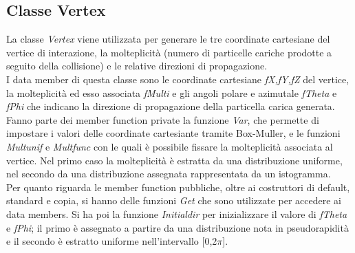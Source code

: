 \documentclass{article}
\begin{document}
\subsection{Classe Vertex}
La classe \textit{Vertex} viene utilizzata per generare le tre coordinate cartesiane del vertice di interazione, la molteplicità (numero di particelle cariche prodotte a seguito della collisione) e le relative direzioni di propagazione.
\\
I data member di questa classe sono le coordinate cartesiane \textit{fX,fY,fZ} del vertice, la molteplicità ed esso associata \textit{fMulti} e gli angoli polare e azimutale \textit{fTheta} e \textit{fPhi} che indicano la direzione di propagazione della particella carica generata. Fanno parte dei member function private la funzione \textit{Var}, che permette di impostare i valori delle coordinate cartesiante tramite Box-Muller, e le funzioni \textit{Multunif} e \textit{Multfunc} con le quali è possibile fissare la molteplicità associata al vertice. Nel primo caso la molteplicità è estratta da una distribuzione uniforme, nel secondo da una distribuzione assegnata rappresentata da un istogramma.
\\
Per quanto riguarda le member function pubbliche, oltre ai costruttori di default, standard e copia, si hanno delle funzioni \textit{Get} che sono utilizzate per accedere ai data members. Si ha poi la funzione \textit{Initialdir} per inizializzare il valore di \textit{fTheta} e \textit{fPhi}; il primo è assegnato a partire da una distribuzione nota in pseudorapidità e il secondo è estratto uniforme nell'intervallo [0,2$\pi$].
\end{document}
